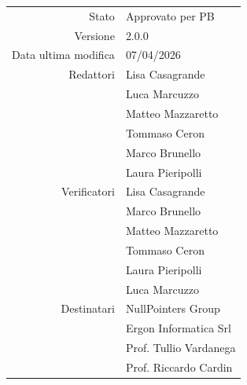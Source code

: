 \begin{center}
\begin{tabular}{r|l}
    Stato & Approvato per PB \\[0.5em]
    Versione & 2.0.0 \\[0.5em]
    Data ultima modifica & 07/04/2026 \\[0.5em]
    Redattori & Lisa Casagrande \\
	          & Luca Marcuzzo \\
	          & Matteo Mazzaretto \\
	          & Tommaso Ceron \\
              & Marco Brunello \\
              & Laura Pieripolli \\[0.5em]
    Verificatori & Lisa Casagrande \\
                 & Marco Brunello \\
	             & Matteo Mazzaretto \\
	             & Tommaso Ceron \\
	             & Laura Pieripolli \\ 
                 & Luca Marcuzzo \\ [0.5em]
    Destinatari & NullPointers Group \\
                & Ergon Informatica Srl \\
                & Prof. Tullio Vardanega \\
                & Prof. Riccardo Cardin \\
    
\end{tabular}
\end{center}
